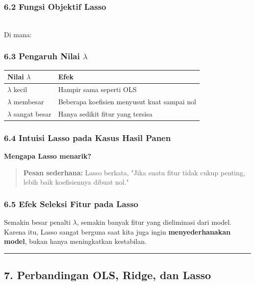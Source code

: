 \documentclass[12pt,a4paper]{article}
\begin{document}
\subsubsection{6.2 Fungsi Objektif Lasso}

\\[
\min_{\beta_0, \beta} \sum_{i=1}^{n} \left( y_i - \beta_0 - \sum_{j=1}^{p} x_{ij}\beta_j \right)^2 + \lambda \sum_{j=1}^{p} \lvert \beta_j \rvert
\\]


Di mana:


\subsubsection{6.3 Pengaruh Nilai $\lambda$}

\begin{tabular}{|l|l|}
\hline
Nilai $\lambda$ & Efek \\
\hline
$\lambda$ kecil & Hampir sama seperti OLS \\
\hline
$\lambda$ membesar & Beberapa koefisien menyusut kuat sampai nol \\
\hline
$\lambda$ sangat besar & Hanya sedikit fitur yang tersisa \\
\hline
\end{tabular}


\subsubsection{6.4 Intuisi Lasso pada Kasus Hasil Panen}

\textbf{Mengapa Lasso menarik?}


\begin{quote}
\textbf{Pesan sederhana:} Lasso berkata, "Jika suatu fitur tidak cukup penting, lebih baik koefisiennya dibuat nol."\end{quote}


\subsubsection{6.5 Efek Seleksi Fitur pada Lasso}

Semakin besar penalti $\lambda$, semakin banyak fitur yang dieliminasi dari model. Karena itu, Lasso sangat berguna saat kita juga ingin \textbf{menyederhanakan model}, bukan hanya meningkatkan kestabilan.


\hrule


\subsection{7. Perbandingan OLS, Ridge, dan Lasso}
\end{document}
